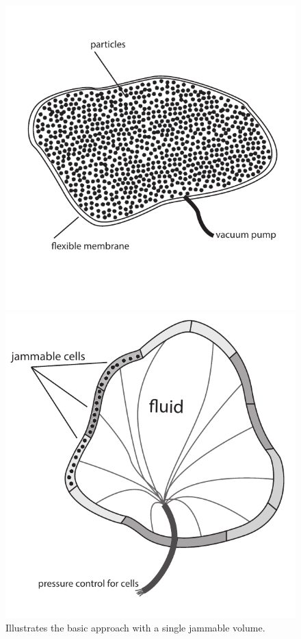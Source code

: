\begin{figure}
  \centering
  \begin{minipage}[t]{.44\textwidth}
    \centering
    \includegraphics[width=\linewidth]{figures/jamming/basic_jamming}
    \caption[The basic jamming approach.]
    {Illustrates the basic approach with a single jammable volume.}
    \label{fig:ch:jamming:approaches:basic}
  \end{minipage}%
  \hspace{0.02\textwidth}
  \begin{minipage}[t]{.44\textwidth}
    \centering
    \includegraphics[width=\linewidth]{figures/jamming/cell_jamming}

\end{minipage}
\end{figure}
